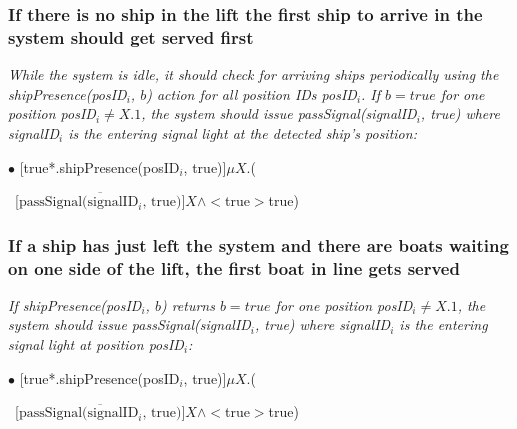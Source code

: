 \subsubsection{If there is no ship in the lift the first ship to arrive in the system should get served first}
\textit{While the system is idle, it should check for arriving ships periodically using the shipPresence(posID$_i$, $b$) action for all position IDs posID$_i$. If $b = true$ for one position posID$_i \neq X.1$, the system should issue passSignal(signalID$_i$, true) where signalID$_i$ is the entering signal light at the detected ship's position:}\vspace{0.3cm}

		$ \bullet $ [true*.shipPresence(posID$_i$, true)]$ \mu X$.(
			\begin{flushright}
				~[$ \overline{\textrm{passSignal(signalID$_i$, true)}} ]X \wedge <$true$>$true)
			\end{flushright}
	
\subsubsection{If a ship has just left the system and there are boats waiting on one side of the lift, the first boat in line gets served}
\textit{If shipPresence(posID$_i$, $b$) returns $b = true$ for one position posID$_i \neq X.1$, the system should issue passSignal(signalID$_i$, true) where signalID$_i$ is the entering signal light at position posID$_i$:}\vspace{0.3cm}

		$ \bullet $ [true*.shipPresence(posID$_i$, true)]$ \mu X$.(
		\begin{flushright}
			~[$ \overline{\textrm{passSignal(signalID$_i$, true)}} ]X \wedge <$true$>$true)
		\end{flushright}
	
